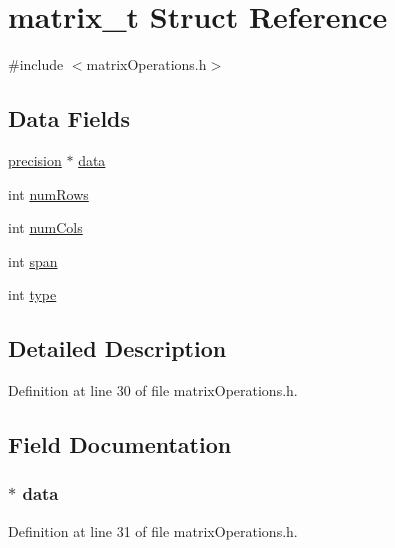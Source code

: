 \hypertarget{structmatrix__t}{\section{matrix\-\_\-t Struct Reference}
\label{structmatrix__t}
}


{\ttfamily \#include $<$matrix\-Operations.\-h$>$}

\subsection*{Data Fields}
\begin{DoxyCompactItemize}
\item 
\hyperlink{matrix_operations_8h_a4b090d5fdf6231e51ec0223d07b8a1b5}{precision} $\ast$ \hyperlink{structmatrix__t_a66b5dd3e91d0645e7e9ad417457e6121}{data}
\item 
int \hyperlink{structmatrix__t_a0801460eb7eb6812bd4e0ce52ab29024}{num\-Rows}
\item 
int \hyperlink{structmatrix__t_a2d4acb52d99b57b5b524aaa557ab91eb}{num\-Cols}
\item 
int \hyperlink{structmatrix__t_a63fc22149930803b4e3fb4c453177e5e}{span}
\item 
int \hyperlink{structmatrix__t_ac765329451135abec74c45e1897abf26}{type}
\end{DoxyCompactItemize}


\subsection{Detailed Description}


Definition at line 30 of file matrix\-Operations.\-h.



\subsection{Field Documentation}
\hypertarget{structmatrix__t_a66b5dd3e91d0645e7e9ad417457e6121}{
\subsubsection[{data}]{$\ast$ data}}\label{structmatrix__t_a66b5dd3e91d0645e7e9ad417457e6121}


Definition at line 31 of file matrix\-Operations.\-h.

